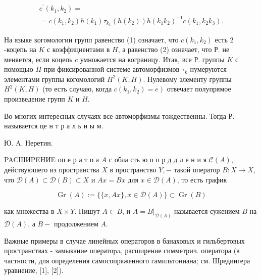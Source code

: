 \documentclass[10pt]{article}
\begin{document}
\[

\begin{gathered}

c^{\prime}\left(k_{1}, k_{2}\right)= \\

=c\left(k_{1}, k_{2}\right) h\left(k_{1}\right) \tau_{k_{1}}\left(h\left(k_{2}\right)\right) h\left(k_{1} k_{2}\right)^{-1} c\left(k_{1}, k_{2} k_{3}\right) .

\end{gathered}

\]



На языке когомологии групп равенство (1) означает, что $c\left(k_{1}, k_{2}\right)$ есть 2 -коцепь на $K$ с коэффициентами в $H$, а равенство (2) означает, что Р. не меняется, если коцепь $c$ умножается на кограницу. Итак, все Р. группы $K$ с помощью $H$ при фиксированной системе автоморфизмов $\tau_{k}$ нумеруются элементами группы когомологий $H^{2}(K, H)$. Нулевому элементу группы $H^{2}(K, H)$ (то есть случаю, когда $\left.c\left(k_{1}, k_{2}\right)=e\right)$ отвечает полупрямое произведение групп $K$ и $H$.



Во многих интересных случаях все автоморфизмы тождественны. Тогда Р. называется це н т р а л ь н ы м.



Ю. A. Неретин.



PACШИPEHИE оп е р а т о а $A$ с обла сть ю о п р д д л е н и я $\mathscr{C}(A)$, действуюшего из пространства $X$ в пространство $Y,-$ такой оператор $B: X \rightarrow X$, что $\mathscr{D}(A) \subset \mathscr{D}(B) \subset X$ и $A x=B x$ для $x \in \mathscr{D}(A)$, то есть график



\[

\operatorname{Gr}(A):=\{\{x, A x\}, x \in \mathscr{D}(A)\} \subset \operatorname{Gr}(B)

\]



как множества в $X \times Y$. Пишут $A \subset B$, и $A=\left.B\right|_{\mathscr{D}(A)}$ называется сужением $B$ на $\mathscr{D}(A)$, а $B-$ продолжением $A$.



Важные примеры в случае линейных операторов в банаховых и гильбертовых пространствах - замыкание оператоpa, расширение симметрич. оператора (в частности, для определения самосопряженного гамильтониана; см. Шредингера уравнение, [1], [2]).
\end{document}
